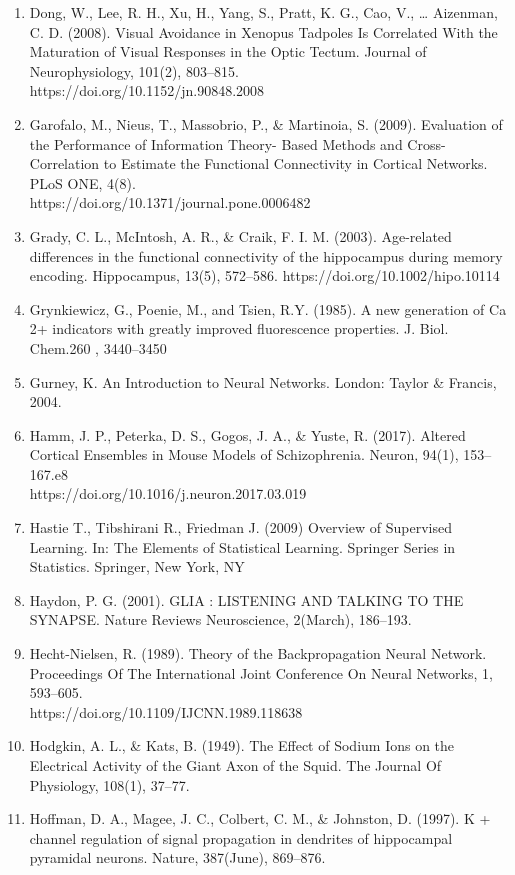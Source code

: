 \documentclass[11pt]{article}
\begin{document}
\begin{enumerate}
\item Dong, W., Lee, R. H., Xu, H., Yang, S., Pratt, K. G., Cao, V., … Aizenman, C. D. (2008). Visual Avoidance in Xenopus Tadpoles Is Correlated With the Maturation of Visual Responses in the Optic Tectum. Journal of Neurophysiology, 101(2), 803–815.\\https://doi.org/10.1152/jn.90848.2008
\item Garofalo, M., Nieus, T., Massobrio, P., \& Martinoia, S. (2009). Evaluation of the Performance of Information Theory- Based Methods and Cross-Correlation to Estimate the Functional Connectivity in Cortical Networks. PLoS ONE, 4(8).\\https://doi.org/10.1371/journal.pone.0006482
\item Grady, C. L., McIntosh, A. R., \& Craik, F. I. M. (2003). Age-related differences in the functional connectivity of the hippocampus during memory encoding. Hippocampus, 13(5), 572–586. https://doi.org/10.1002/hipo.10114
\item Grynkiewicz, G., Poenie, M., and Tsien, R.Y. (1985). A new generation of Ca 2+ indicators with greatly improved fluorescence properties. J. Biol. Chem.260 , 3440–3450
\item Gurney, K. An Introduction to Neural Networks. London: Taylor \& Francis, 2004.
\item Hamm, J. P., Peterka, D. S., Gogos, J. A., \& Yuste, R. (2017). Altered Cortical Ensembles in Mouse Models of Schizophrenia. Neuron, 94(1), 153–167.e8\\https://doi.org/10.1016/j.neuron.2017.03.019
\item Hastie T., Tibshirani R., Friedman J. (2009) Overview of Supervised Learning. In: The Elements of Statistical Learning. Springer Series in Statistics. Springer, New York, NY
\item Haydon, P. G. (2001). GLIA : LISTENING AND TALKING TO THE SYNAPSE. Nature Reviews Neuroscience, 2(March), 186–193.
\item Hecht-Nielsen, R. (1989). Theory of the Backpropagation Neural Network. Proceedings Of The International Joint Conference On Neural Networks, 1, 593–605.\\https://doi.org/10.1109/IJCNN.1989.118638
\item Hodgkin, A. L., \& Kats, B. (1949). The Effect of Sodium Ions on the Electrical Activity of the Giant Axon of the Squid. The Journal Of Physiology, 108(1), 37–77.
\item Hoffman, D. A., Magee, J. C., Colbert, C. M., \& Johnston, D. (1997). K + channel regulation of signal propagation in dendrites of hippocampal pyramidal neurons. Nature, 387(June), 869–876.

\end{enumerate}
\end{document}
